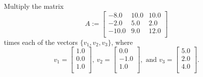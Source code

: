 \vspace*{.2cm}
\begin{example} Multiply the matrix 
\begin{equation}
A:=\left[
\begin{array}{rrr}
-8.0 & 10.0 & 10.0 \\
-2.0 & 5.0 & 2.0 \\
-10.0 & 9.0 & 12.0 \\
\end{array}
\right]
\end{equation}
times each of the vectors $\{v_1, v_2, v_3 \}$, where 
\begin{equation}
v_1=\left[
\begin{array}{r}
1.0 \\
0.0 \\
1.0 \\
\end{array}
\right],~v_2=\left[
\begin{array}{r}
0.0 \\
-1.0 \\
1.0 \\
\end{array}
\right], \text{ and } v_3=\left[
\begin{array}{c}
5.0 \\
2.0 \\
4.0 \\
\end{array}
\right].
\end{equation}

\end{example}

